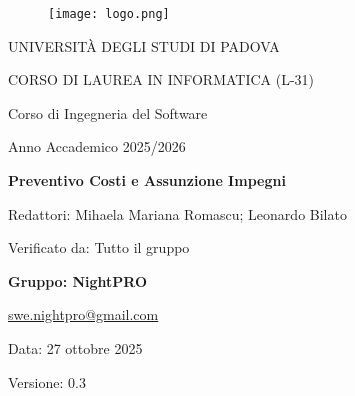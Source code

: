 \documentclass[a4paper, 11pt, oneside]{scrartcl} %
\begin{document}
\thispagestyle{empty}
\begin{titlepage}
    \centering
    
\begin{figure}
    \centering
    \texttt{[image: logo.png]}
\end{figure}

    \vfill
    
    {\small UNIVERSITÀ DEGLI STUDI DI PADOVA \par}
    {\small CORSO DI LAUREA IN INFORMATICA (L-31) \par}
    \vspace{0.5cm}
    {\large Corso di Ingegneria del Software \par}
    {\small Anno Accademico 2025/2026 \par}


    
    \vfill
    
    {\Huge \bfseries Preventivo Costi e Assunzione Impegni \par}
    
    \vspace{1cm}
    
    {\Large Redattori: Mihaela Mariana Romascu; Leonardo Bilato \par}
    {\Large Verificato da: Tutto il gruppo  \par} 

    
    \vfill
    
    {\Large \bfseries Gruppo: NightPRO \par}
    \vspace{0.5cm}
    {\large \href{mailto:swe.nightpro@gmail.com}{swe.nightpro@gmail.com} \par}
    
    \vfill
    
    {\large Data: 27 ottobre 2025 \par}
    {\Large Versione: 0.3 \par} 

\end{titlepage}




\newpage
\pagestyle{fancy}
\end{document}
